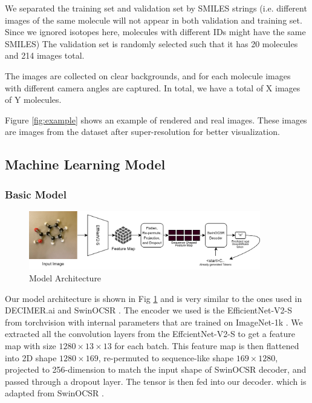 \documentclass{article}
\begin{document}
We separated the training set and validation set by SMILES strings (i.e. different images of the same molecule will not appear in both validation and training set. Since we ignored isotopes here, molecules with different IDs might have the same SMILES) The validation set is randomly selected such that it has 20 molecules and 214 images total. 

The images are collected on clear backgrounds, and for each molecule images with different camera angles are captured. In total, we have a total of X images of Y molecules. 

Figure \ref{fig:example} shows an example of rendered and real images. These images are images from the dataset after super-resolution for better visualization. 
\subsection{Machine Learning Model} 
\subsubsection{Basic Model}
\begin{figure}
    \centering
    \includegraphics[width=0.9\textwidth]{arch}
    \caption{Model Architecture}
    \label{fig:arch}
\end{figure}
Our model architecture is shown in Fig \ref{fig:arch} and is very similar to the ones used in DECIMER.ai \autocite{decimer} and SwinOCSR \autocite{swinocsr}. The encoder we used is the EfficientNet-V2-S \autocite{effv2} from torchvision \autocite{torchvision2016} with internal parameters that are trained on ImageNet-1k \autocite{imagenet}. We extracted all the convolution layers from the EffcientNet-V2-S to get a feature map with size $1280\times13\times13$  for each batch. This feature map is then flattened into 2D shape $1280\times169$, re-permuted to sequence-like shape $169\times1280$, projected to 256-dimension to match the input shape of SwinOCSR decoder, and passed through a dropout layer. The tensor is then fed into our decoder. which is adapted from SwinOCSR \autocite{swinocsr}. 
\end{document}

